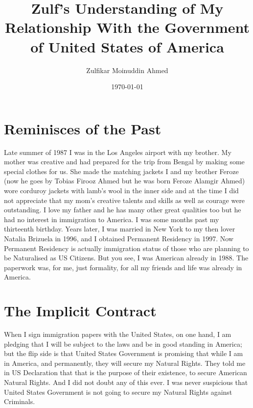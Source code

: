 \documentclass{amsart}
\title{Zulf's Understanding of My Relationship With the Government of United States of America}
\author{Zulfikar Moinuddin Ahmed}
\date{\today}
\begin{document}
\maketitle

\section{Reminisces of the Past}

Late summer of 1987 I was in the Los Angeles airport with my brother.  My mother was creative and had prepared for the trip from Bengal by making some special clothes for us.  She made the matching jackets I and my brother Feroze (now he goes by Tobias Firooz Ahmed but he was born Feroze Alamgir Ahmed) wore corduroy jackets with lamb's wool in the inner side and at the time I did not appreciate that my mom's creative talents and skills as well as courage were outstanding.  I love my father and he has many other great qualities too but he had no interest in immigration to America.  I was some months past my thirteenth birthday.  Years later, I was married in New York to my then lover Natalia Brizuela in 1996, and I obtained Permanent Residency in 1997.  Now Permanent Residency is actually immigration status of those who are planning to be Naturalised as US Citizens.  But you see, I was American already in 1988.  The paperwork was, for me, just formality, for all my friends and life was already in America.  

\section{The Implicit Contract}

When I sign immigration papers with the United States, on one hand, I am pledging that I will be subject to the laws and be in good standing in America; but the flip side is that United States Government is promising that while I am in America, and permanently, they will secure my Natural Rights.  They told me in US Declaration that that is the purpose of their existence, to secure American Natural Rights.  And I did not doubt any of this ever.  I was never suspicious that United States Government is not going to secure my Natural Rights against Criminals. 
\end{document}
